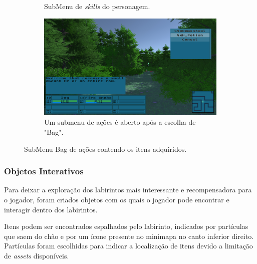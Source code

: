 \documentclass[
	12pt,				%
	openright,			%
	twoside,			%
	a4paper,			%
	english,			%
	french,				%
	spanish,			%
	brazil				%
	]{abntex2}
\begin{document}
\begin{figure}[h!]
\begin{subfigure}[b]{0.45\linewidth}
    \caption{SubMenu de \emph{skills} do personagem.}
  \end{subfigure}
  \begin{subfigure}[b]{0.45\linewidth}
    \includegraphics[width=\linewidth]{bag.jpg}
    \caption{Um submenu de ações é aberto após a escolha de "Bag".}
  \end{subfigure}
  \caption{SubMenu Bag de ações contendo os itens adquiridos.}
  \label{fig:menu2}
\end{figure}
\pagebreak
\subsubsection{Objetos Interativos}

Para deixar a exploração dos labirintos mais interessante e recompensadora para o jogador, foram criados objetos com os quais o jogador pode encontrar e interagir dentro dos labirintos.

	Itens podem ser encontrados espalhados pelo labirinto, indicados por partículas que saem do chão e por um ícone presente no minimapa no canto inferior direito. Partículas foram escolhidas para indicar a localização de itens devido a limitação de \emph{assets} disponíveis.
	
\end{document}
